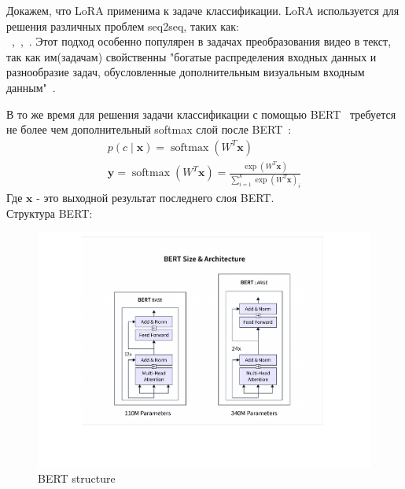  Докажем, что LoRA применима к задаче классификации. LoRA  используется для решения различных проблем seq2seq, таких как:\\~\cite{zhang2023adding},~\cite{dettmers2024qlora},~\cite{dai2024instructblip}. Этот подход особенно популярен в задачах преобразования видео в текст, так как им(задачам) свойственны "богатые распределения входных данных и разнообразие задач, обусловленные дополнительным визуальным входным данным"~\cite{dai2024instructblip}. 

В то же время для решения задачи классификации с помощью BERT~\cite{vaswani2017attention} требуется не более чем дополнительный softmax слой после BERT~\cite{sun2019fine}: 
\begin{equation}
\label{eq:5}
\begin{aligned}
p(c \mid \mathbf{x})=\operatorname{softmax}(W^T \mathbf{x})\\
\hat{\mathbf{y}}=\operatorname{softmax}\left(W^T \mathbf{x}\right)=\frac{\exp \left(W^T \mathbf{x}\right)}{\sum_{i=1}^k \exp \left(W^T \mathbf{x}\right)_i}
\end{aligned}
\end{equation}
Где $\mathbf{x}$ - это выходной результат последнего слоя BERT.\\
Структура BERT:

\begin{figure}[h]
    \centering
    \includegraphics[width=1.0\textwidth]{images/bert_architecture copy.pdf}
    \caption{BERT structure}
\end{figure}

